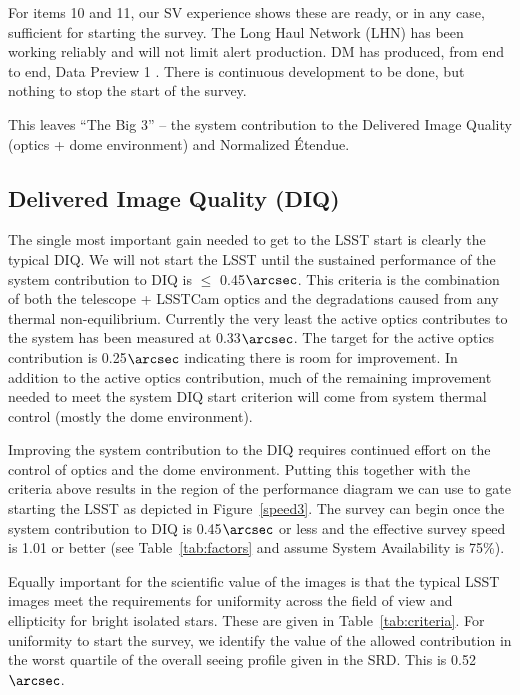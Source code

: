For items 10 and 11, our SV experience shows these are ready, or in any case, sufficient for starting the survey. The Long Haul Network (LHN) has been working reliably and will not limit alert production. DM has produced, from end to end, Data Preview 1 \citep[DP1; see][]{RTN-095}. There is continuous development to be done, but nothing to stop the start of the survey.  

This leaves ``The Big 3'' -- the system contribution to the Delivered Image Quality (optics + dome environment) and Normalized \'{E}tendue.

\subsection{Delivered Image Quality (DIQ)}

The single most important gain needed to get to the LSST start is clearly the typical DIQ.  We will not start the LSST until the sustained performance of the system contribution to DIQ is $\le$ 0.45$\arcsec$.  This criteria is the combination of both the telescope + LSSTCam optics and the degradations caused from any thermal non-equilibrium. Currently the very least the active optics contributes to the system has been measured at 0.33$\arcsec$.  The target for the active optics contribution is 0.25$\arcsec$ indicating there is room for improvement.  In addition to the active optics contribution, much of the remaining improvement needed to meet the system DIQ start criterion will come from system thermal control (mostly the dome environment).

Improving the system contribution to the DIQ requires continued effort on the control of optics and the dome environment. Putting this together with the criteria above results in the region of the performance diagram we can use to gate starting the LSST as depicted in Figure~\ref{speed3}. The survey can begin once the system contribution to DIQ is 0.45$\arcsec$ or less and the effective survey speed is 1.01 or better (see Table~\ref{tab:factors} and assume System Availability is 75$\%$).

Equally important for the scientific value of the images is that the typical LSST images meet the requirements for uniformity across the field of view and ellipticity for bright isolated stars. These are given in Table~\ref{tab:criteria}. For uniformity to start the survey, we identify the value of the allowed contribution in the worst quartile of the overall seeing profile given in the SRD. This is 0.52$\arcsec$. 

